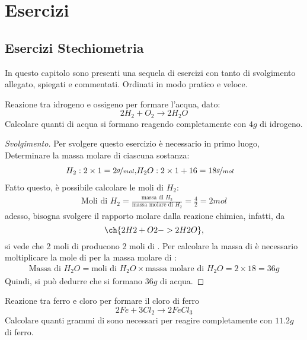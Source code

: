 \part{Esercizi}
\label{part:es}

\chapter{Esercizi Stechiometria}
\label{chap:esstechiometria}
In questo capitolo sono presenti una sequela di esercizi con tanto di
svolgimento allegato, spiegati e commentati. Ordinati in modo pratico
e veloce.
\begin{ess}
  \label{ess:esstechiometria1}
  Reazione tra idrogeno e ossigeno per formare l'acqua, dato:
  \begin{equation}
    \label{eq:esstechiometria1}
    2H_2+O_2\to 2H_2O
  \end{equation}
  Calcolare quanti di acqua si formano reagendo completamente con $4g$ di
  idrogeno.
\end{ess}
\begin{proof}[Svolgimento]
  Per svolgere questo esercizio è necessario in primo luogo, Determinare la
  massa molare di ciascuna sostanza:
  \begin{eqnarray*}
    H_2:2\times 1=2\nicefrac{g}{mol}, & H_2O: 2\times 1+16=18\nicefrac{g}{mol}
  \end{eqnarray*}
  Fatto questo, è possibile calcolare le moli di $H_2$:
  \begin{eqnarray*}
    \text{Moli di }H_2=\frac{\text{massa di } H_2}{\text{massa molare di }H_2}=\frac{4}{2}=
    2mol
  \end{eqnarray*}
  adesso, bisogna svolgere il rapporto molare dalla reazione chimica, infatti,
  da \[\ch{2 H2 + O2 -> 2 H2O},\] si vede che 2 moli di  producono 2 moli di
  . Per calcolare la massa di  è necessario moltiplicare la mole di  per la massa molare
  di :
  \begin{eqnarray*}
    \text{Massa di } H_2O=\text{moli di } H_2O \times \text{massa molare di } H_2O=2\times 18 =36g
  \end{eqnarray*}
  Quindi, si può dedurre che si formano $36g$ di acqua.
\end{proof}
\begin{ess}
  \label{ess:esstechiometria2}
  Reazione tra ferro e cloro per formare il cloro di ferro
  \begin{equation}
    \label{eq:esstechiometria2}
    2Fe+3Cl_2\to 2FeCl_{3}
  \end{equation}
  Calcolare quanti grammi di  sono necessari per reagire completamente con $11.2g$ di ferro.
\end{ess}
